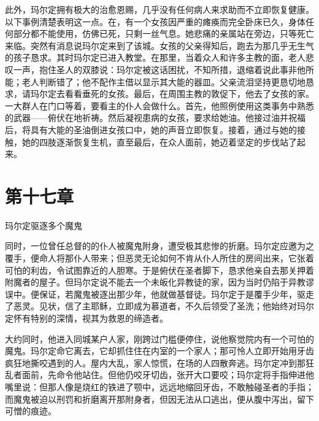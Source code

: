 此外，玛尔定拥有极大的治愈恩赐，几乎没有任何病人来求助而不立即恢复健康。以下事例清楚表明这一点。在，有一个女孩因严重的瘫痪而完全卧床已久，身体任何部分都不能使用，仿佛已死，只剩一丝气息。她悲痛的亲属站在旁边，只等死亡来临。突然有消息说玛尔定来到了该城。女孩的父亲得知后，跑去为那几乎无生气的孩子恳求。其时玛尔定已进入教堂。在那里，当着众人和许多主教的面，老人悲叹一声，抱住圣人的双膝说：玛尔定被这话困扰，不知所措，退缩着说此事非他所能；老人判断错了；他不配作主借以显示其大能的器皿。父亲流泪坚持更恳切地恳求，请玛尔定去看看垂死的女孩。最后，在周围主教的敦促下，他去了女孩的家。一大群人在门口等着，要看主的仆人会做什么。首先，他照例使用这类事务中熟悉的武器——俯伏在地祈祷。然后凝视患病的女孩，要求给她油。他接过油并祝福后，将具有大能的圣油倒进女孩口中，她的声音立即恢复。接着，通过与她的接触，她的四肢逐渐恢复生机，直至最后，在众人面前，她迈着坚定的步伐站了起来。\par


\section{第十七章}

玛尔定驱逐多个魔鬼\par

同时，一位曾任总督的的仆人被魔鬼附身，遭受极其悲惨的折磨。玛尔定应邀为之覆手，便命人将那仆人带来；但恶灵无论如何不肯从仆人所住的房间出来，它张着可怕的利齿，令试图靠近的人胆寒。于是俯伏在圣者脚下，恳求他亲自去那关押着附魔者的屋子。但玛尔定说不能去一个未皈化异教徒的家，因为当时仍陷于异教谬误中。便保证，若魔鬼被逐出那少年，他就做基督徒。玛尔定于是覆手少年，驱走了恶灵。见状，信了主耶稣，立即成为慕道者，不久后领受了圣洗；他始终对玛尔定怀有特别的深情，视其为救恩的缔造者。\par

大约同时，他进入同城某户人家，刚跨过门槛便停住，说他察觉院内有一个可怕的魔鬼。玛尔定命它离去，它却抓住住在内室的一个家人；那可怜人立即开始用牙齿疯狂地撕咬遇到的人。屋内大乱，家人惊慌，在场的人四散奔逃。玛尔定冲到那狂乱者面前，先命令他站住。但他仍咬牙切齿，张开大口要咬；玛尔定将手指伸进他嘴里说：但那人像是烧红的铁进了颚中，远远地缩回牙齿，不敢触碰圣者的手指；而魔鬼被迫以刑罚和折磨离开那附身者，但因无法从口逃出，便从腹中泻出，留下可憎的痕迹。\par

